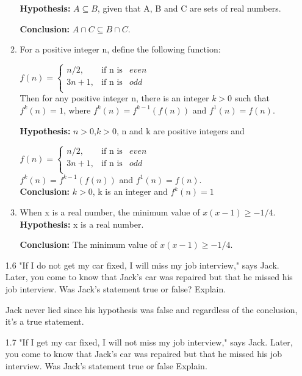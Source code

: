 \documentclass[11pt]{article}
\begin{document}
\begin{enumerate}
\begin{enumerate}
    \textbf{Hypothesis:} $A \subseteq B$, given that A, B and C are sets of real numbers.\par 
    \textbf{Conclusion:} $A \cap C \subseteq B \cap C$.\par 
    \item For a positive integer n, define the following function:\par 
    \hspace{10em} $f(n)=\left\{ \begin{array}{rcl}n/2,& \mbox{if n is}& even\\ 3n+1, & \mbox{if n is}&odd\\
    \end{array}\right.$\\
   Then for any positive integer n, there is an integer $k > 0$ such that $f^k(n)=1$, where $f^k(n) = f^{k-1}(f(n))$ and $f^1(n) = f(n).$\par 
     \textbf{Hypothesis:} $n > 0$,$k>0$, n and k are positive integers and \par 
     \hspace{10em} $f(n)=\left\{ \begin{array}{rcl}n/2,& \mbox{if n is}& even\\ 3n+1, & \mbox{if n is}&odd\\
    \end{array}\right.$\\
    $f^k(n) = f^{k-1}(f(n))$ and $f^1(n) = f(n).$\\
     \textbf{Conclusion:} $k>0$, k is an integer and $f^k(n)=1$
     \item When x is a real number, the minimum value of $x(x-1) \geq -1/4$.\\
     \textbf{Hypothesis:} x is a real number.\par 
     \textbf{Conclusion:} The minimum value of $x(x-1) \geq -1/4$.
   \end{enumerate}
   \item[1.6] "If I do not get my car fixed, I will miss my job interview," says Jack. Later, you come to know that Jack’s car was repaired but that he missed his job interview. Was Jack’s statement true or false? Explain.\par 
   \hspace{3em}Jack never lied since his hypothesis was false and regardless of the conclusion, it's a true statement.
   \item[1.7]"If I get my car fixed, I will not miss my job interview," says Jack. Later, you come to know that Jack’s car was repaired but that he missed his job interview. Was Jack’s statement true or false Explain.\par

\end{enumerate}
\end{document}
